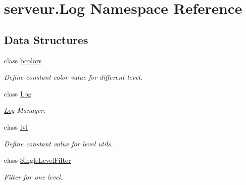 \hypertarget{namespaceserveur_1_1_log}{}\section{serveur.\+Log Namespace Reference}
\label{namespaceserveur_1_1_log}
\subsection*{Data Structures}
\begin{DoxyCompactItemize}
\item 
class \hyperlink{classserveur_1_1_log_1_1bcolors}{bcolors}
\begin{DoxyCompactList}\small\item\em Define constant color value for different level. \end{DoxyCompactList}\item 
class \hyperlink{classserveur_1_1_log_1_1_log}{Log}
\begin{DoxyCompactList}\small\item\em \hyperlink{classserveur_1_1_log_1_1_log}{Log} Manager. \end{DoxyCompactList}\item 
class \hyperlink{classserveur_1_1_log_1_1lvl}{lvl}
\begin{DoxyCompactList}\small\item\em Define constant value for level utils. \end{DoxyCompactList}\item 
class \hyperlink{classserveur_1_1_log_1_1_single_level_filter}{Single\+Level\+Filter}
\begin{DoxyCompactList}\small\item\em Filter for one level. \end{DoxyCompactList}\end{DoxyCompactItemize}

